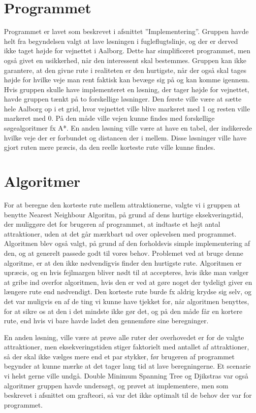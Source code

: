 \section{Programmet}
Programmet er lavet som beskrevet i afsnittet ”Implementering”. Gruppen havde helt fra begyndelsen valgt at lave løsningen i fugleflugtslinje, og der er derved ikke taget højde for vejnettet i Aalborg. Dette har simplificeret programmet, men også givet en usikkerhed, når den interessent skal bestemmes. Gruppen kan ikke garantere, at den givne rute i realiteten er den hurtigste, når der også skal tages højde for hvilke veje man rent faktisk kan bevæge sig på og kan komme igennem. 
Hvis gruppen skulle have implementeret en løsning, der tager højde for vejnettet, havde gruppen tænkt på to forskellige løsninger. Den første ville være at sætte hele Aalborg op i et grid, hvor vejnettet ville blive markeret med 1 og resten ville markeret med 0. På den måde ville vejen kunne findes med forskellige søgealgoritmer fx A*. En anden løsning ville være at have en tabel, der indikerede hvilke veje der er forbundet og distancen der i mellem. Disse løsninger ville have gjort ruten mere præcis, da den reelle korteste rute ville kunne findes. 

\section{Algoritmer}
For at beregne den korteste rute mellem attraktionerne, valgte vi i gruppen at benytte Nearest Neighbour Algoritm, på grund af dens hurtige eksekveringstid, der muliggøre det for brugeren af programmet, at indtaste et højt antal attraktioner, uden at det går mærkbart ud over oplevelsen med programmet. Algoritmen blev også valgt, på grund af den forholdsvis simple implementering af den, og at generelt passede godt til vores behov. Problemet ved at bruge denne algoritme, er at den ikke nødvendigvis finder den hurtigste rute. Algoritmen er upræcis, og en hvis fejlmargen bliver nødt til at accepteres, hvis ikke man vælger at gribe ind overfor algoritmen, hvis den er ved at gøre noget der tydeligt giver en længere rute end nødvendigt. Den korteste rute burde fx aldrig krydse sig selv, og det var muligvis en af de ting vi kunne have tjekket for, når algoritmen benyttes, for at sikre os at den i det mindste ikke gør det, og på den måde får en kortere rute, end hvis vi bare havde ladet den gennemføre sine beregninger. 

En anden løsning, ville være at prøve alle ruter der overhovedet er for de valgte attraktioner, men eksekveringstiden stiger faktorielt med antallet af attraktioner, så der skal ikke vælges mere end et par stykker, før brugeren af programmet begynder at kunne mærke at det tager lang tid at lave beregningerne. Et scenarie vi helst gerne ville undgå.
Double Minimum Spanning Tree og Djikstras var også algoritmer gruppen havde undersøgt, og prøvet at implementere, men som beskrevet i afsnittet om grafteori, så var det ikke optimalt til de behov der var for programmet. 

